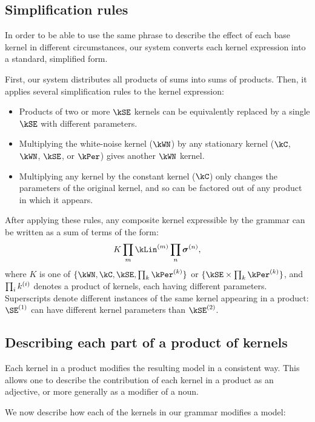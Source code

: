 \subsection{Simplification rules}
\label{sec:desc-simplification}

In order to be able to use the same phrase to describe the effect of each base kernel in different circumstances, our system converts each kernel expression into a standard, simplified form.

First, our system distributes all products of sums into sums of products.
Then, it applies several simplification rules to the kernel expression:

\begin{itemize}
\item Products of two or more $\kSE$ kernels can be equivalently replaced by a single $\kSE$ with different parameters.
\item Multiplying the white-noise kernel ($\kWN$) by any stationary kernel ($\kC$, $\kWN$, $\kSE$, or $\kPer$) gives another $\kWN$ kernel.
\item Multiplying any kernel by the constant kernel ($\kC$) only changes the parameters of the original kernel, and so can be factored out of any product in which it appears.
\end{itemize}

After applying these rules, any composite kernel expressible by the grammar can be written as a sum of terms of the form:
\begin{align}
K \prod_m \kLin^{(m)} \prod_n \boldsymbol\sigma^{(n)},
\label{eq:sop}
\end{align}
where $K$ is one of $\{\kWN, \kC, \kSE, \prod_k \kPer^{(k)}\}$ or $\{\kSE \times \prod_k \kPer^{(k)}\}$, 
and $\prod_ik^{(i)}$ denotes a product of kernels, each having different parameters.
Superscripts denote different instances of the same kernel appearing in a product: $\SE^{(1)}$ can have different kernel parameters than $\kSE^{(2)}$.


\subsection{Describing each part of a product of kernels}

Each kernel in a product modifies the resulting \gp{} model in a consistent way.
This allows one to describe the contribution of each kernel in a product as an adjective, or more generally as a modifier of a noun.

We now describe how each of the kernels in our grammar modifies a \gp{} model:

